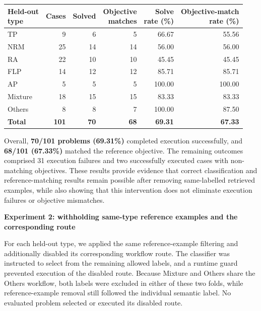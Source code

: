 \documentclass[11pt]{article}
\begin{document}
\begin{enumerate}[label=(R1.Major.\arabic*),leftmargin=*]
\begin{center}
\small
\setlength{\tabcolsep}{5pt}
\renewcommand{\arraystretch}{1.12}
\begin{tabular}{lrrrrr}
\hline
\shortstack[l]{Held-out\\type}
& Cases
& Solved
& \shortstack{Objective\\matches}
& \shortstack{Solve\\rate (\%)}
& \shortstack{Objective-match\\rate (\%)} \\
\hline
TP      & 9  & 6  & 5  & 66.67  & 55.56 \\
NRM     & 25 & 14 & 14 & 56.00  & 56.00 \\
RA      & 22 & 10 & 10 & 45.45  & 45.45 \\
FLP     & 14 & 12 & 12 & 85.71  & 85.71 \\
AP      & 5  & 5  & 5  & 100.00 & 100.00 \\
Mixture & 18 & 15 & 15 & 83.33  & 83.33 \\
Others  & 8  & 8  & 7  & 100.00 & 87.50 \\
\hline
\textbf{Total}
& \textbf{101}
& \textbf{70}
& \textbf{68}
& \textbf{69.31}
& \textbf{67.33} \\
\hline
\end{tabular}
\end{center}

Overall, \textbf{70/101 problems (69.31\%)} completed execution successfully, and \textbf{68/101 (67.33\%)} matched the reference objective. The remaining outcomes comprised 31 execution failures and two successfully executed cases with non-matching objectives. These results provide evidence that correct classification and reference-matching results remain possible after removing same-labelled retrieved examples, while also showing that this intervention does not eliminate execution failures or objective mismatches.

\medskip
\noindent\textbf{Experiment 2: withholding same-type reference examples and the corresponding route}

For each held-out type, we applied the same reference-example filtering and additionally disabled its corresponding workflow route. The classifier was instructed to select from the remaining allowed labels, and a runtime guard prevented execution of the disabled route. Because Mixture and Others share the Others workflow, both labels were excluded in either of these two folds, while reference-example removal still followed the individual semantic label. No evaluated problem selected or executed its disabled route.


\end{enumerate}
\end{document}
